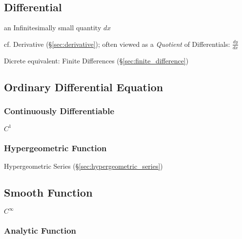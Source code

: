 \subsection{Differential}\label{sec:differential}

an Infinitesimally small quantity $dx$

cf. Derivative (\S\ref{sec:derivative}); often viewed as a \emph{Quotient} of
Differentials: $\frac{dy}{dx}$

\fist Dicrete equivalent: Finite Differences (\S\ref{sec:finite_difference})



\subsection{Ordinary Differential Equation}\label{sec:ode}

\subsubsection{Continuously Differentiable}
\label{sec:continuously_differentiable}

$C^1$



\subsubsection{Hypergeometric Function}
\label{sec:hypergeometric_function}

Hypergeometric Series (\S\ref{sec:hypergeometric_series})



\subsection{Smooth Function}\label{sec:smooth_function}

$C^{\infty}$



\subsubsection{Analytic Function}\label{sec:analytic_function}

